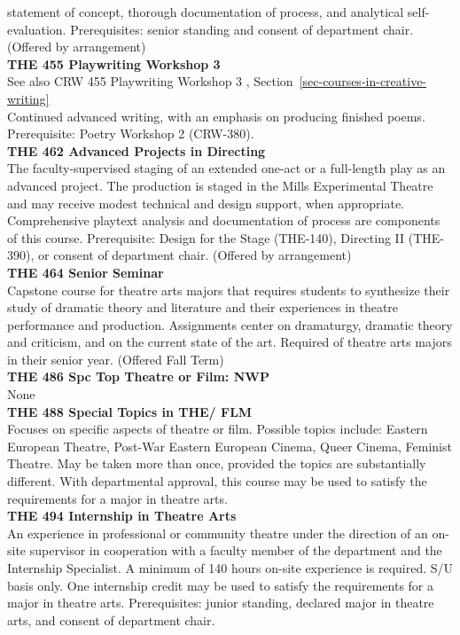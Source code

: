 \documentclass[
  letterpaper,
]{scrbook}
\begin{document}
statement of concept, thorough documentation of process, and analytical
self-evaluation. Prerequisites: senior standing and consent of
department chair. (Offered by arrangement)\\
\textbf{THE 455 Playwriting Workshop 3}\\
See also CRW 455 Playwriting Workshop 3 ,
Section~\ref{sec-courses-in-creative-writing}\\
Continued advanced writing, with an emphasis on producing finished
poems. Prerequisite: Poetry Workshop 2 (CRW-380).\\
\textbf{THE 462 Advanced Projects in Directing}\\
The faculty-supervised staging of an extended one-act or a full-length
play as an advanced project. The production is staged in the Mills
Experimental Theatre and may receive modest technical and design
support, when appropriate. Comprehensive playtext analysis and
documentation of process are components of this course. Prerequisite:
Design for the Stage (THE-140), Directing II (THE-390), or consent of
department chair. (Offered by arrangement)\\
\textbf{THE 464 Senior Seminar}\\
Capstone course for theatre arts majors that requires students to
synthesize their study of dramatic theory and literature and their
experiences in theatre performance and production. Assignments center on
dramaturgy, dramatic theory and criticism, and on the current state of
the art. Required of theatre arts majors in their senior year. (Offered
Fall Term)\\
\textbf{THE 486 Spc Top Theatre or Film: NWP}\\
None\\
\textbf{THE 488 Special Topics in THE/ FLM}\\
Focuses on specific aspects of theatre or film. Possible topics include:
Eastern European Theatre, Post-War Eastern European Cinema, Queer
Cinema, Feminist Theatre. May be taken more than once, provided the
topics are substantially different. With departmental approval, this
course may be used to satisfy the requirements for a major in theatre
arts.\\
\textbf{THE 494 Internship in Theatre Arts}\\
An experience in professional or community theatre under the direction
of an on-site supervisor in cooperation with a faculty member of the
department and the Internship Specialist. A minimum of 140 hours on-site
experience is required. S/U basis only. One internship credit may be
used to satisfy the requirements for a major in theatre arts.
Prerequisites: junior standing, declared major in theatre arts, and
consent of department chair.
\end{document}
